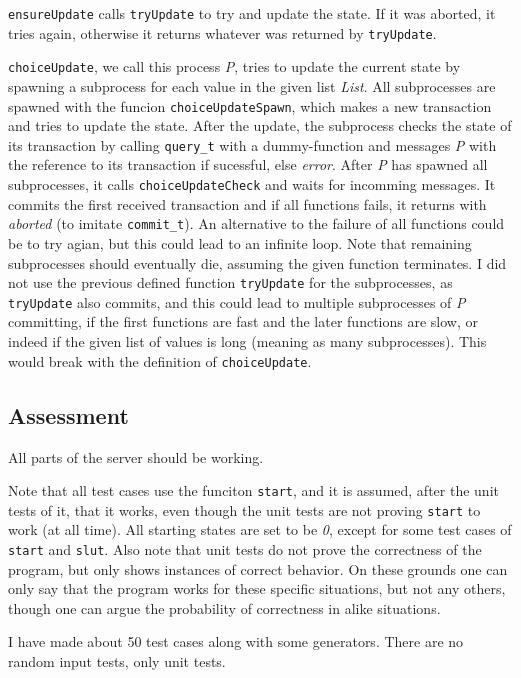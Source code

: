 \documentclass[a4paper, 10pt]{article}
\begin{document}
\texttt{ensureUpdate} calls \texttt{tryUpdate} to try and update the state. If it was aborted, it tries again, otherwise it returns whatever was returned by \texttt{tryUpdate}.

\texttt{choiceUpdate}, we call this process \textit{P}, tries to update the current state by spawning a subprocess for each value in the given list \textit{List}. All subprocesses are spawned with the funcion \texttt{choiceUpdateSpawn}, which makes a new transaction and tries to update the state. After the update, the subprocess checks the state of its transaction by calling \texttt{query\_t} with a dummy-function and messages \textit{P} with the reference to its transaction if sucessful, else \textit{error}.
After \textit{P} has spawned all subprocesses, it calls \texttt{choiceUpdateCheck} and waits for incomming messages. It commits the first received transaction and if all functions fails, it returns with \textit{aborted} (to imitate \texttt{commit\_t}). An alternative to the failure of all functions could be to try agian, but this could lead to an infinite loop. Note that remaining subprocesses should eventually die, assuming the given function terminates.
I did not use the previous defined function \texttt{tryUpdate} for the subprocesses, as \texttt{tryUpdate} also commits, and this could lead to multiple subprocesses of \textit{P} committing, if the first functions are fast and the later functions are slow, or indeed if the given list of values is long (meaning as many subprocesses). This would break with the definition of \texttt{choiceUpdate}.

\subsection{Assessment}
All parts of the server should be working.

Note that all test cases use the funciton \texttt{start}, and it is assumed, after the unit tests of it, that it works, even though the unit tests are not proving \texttt{start} to work (at all time). All starting states are set to be \textit{0}, except for some test cases of \texttt{start} and \texttt{slut}.
Also note that unit tests do not prove the correctness of the program, but only shows instances of correct behavior. On these grounds one can only say that the program works for these specific situations, but not any others, though one can argue the probability of correctness in alike situations.

I have made about 50 test cases along with some generators. There are no random input tests, only unit tests.
\end{document}
